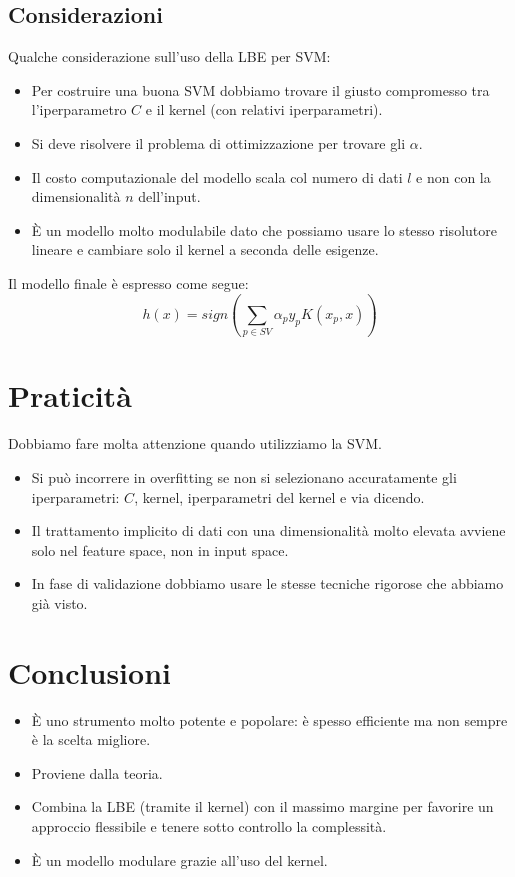 \subsection{Considerazioni}
Qualche considerazione sull'uso della LBE per SVM:
\begin{itemize}
	\item Per costruire una buona SVM dobbiamo trovare il giusto compromesso tra l'iperparametro $C$ e il kernel (con
	      relativi iperparametri).
	\item Si deve risolvere il problema di ottimizzazione per trovare gli $\alpha$.
	\item Il costo computazionale del modello scala	col numero di dati $l$ e non con la dimensionalit\`a $n$ dell'input.
	\item \`E un modello molto modulabile dato che possiamo usare lo stesso risolutore lineare e cambiare solo il kernel
	      a seconda delle esigenze.
\end{itemize}

Il modello finale \`e espresso come segue:
\[ h(x) = sign \left( \sum_{p \in SV} \alpha_p y_p K(x_p, x) \right) \]

\section{Praticit\`a}
Dobbiamo fare molta attenzione quando utilizziamo la SVM.
\begin{itemize}
	\item Si pu\`o incorrere in overfitting se non si selezionano accuratamente gli iperparametri: $C$, kernel,
	      iperparametri del kernel e via dicendo.
	\item Il trattamento implicito di dati con una dimensionalit\`a molto elevata avviene solo nel feature space, non
	      in input space.
	\item In fase di validazione dobbiamo usare le stesse tecniche rigorose che abbiamo gi\`a visto.
\end{itemize}

\section{Conclusioni}

\begin{itemize}
	\item \`E uno strumento molto potente e popolare: \`e spesso efficiente ma non sempre \`e la scelta migliore.
	\item Proviene dalla teoria.
	\item Combina la LBE (tramite il kernel) con il massimo margine per favorire un approccio flessibile e tenere sotto
	      controllo la complessit\`a.
	\item \`E un modello modulare grazie all'uso del kernel.
\end{itemize}